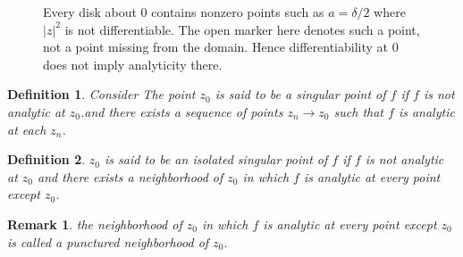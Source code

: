 \documentclass{report}
\newtheorem{definition}{Definition}
\newtheorem{remark}{Remark}
\begin{document}
\begin{figure}[H]
    \centering
    \caption{Every disk about $0$ contains nonzero points such as $a=\delta/2$ where $|z|^2$ is not differentiable. The open marker here denotes such a point, not a point missing from the domain. Hence differentiability at $0$ does not imply analyticity there.}
    \label{fig:modulus-not-analytic}
\end{figure}


\begin{definition}
    Consider The point $z_0$ is said to be a singular point of $f$ if $f$ is not analytic at $z_0$.and there exists a sequence of points $z_n \to z_0$ such that $f$ is analytic at each $z_n$.
\end{definition}

\begin{definition}
    $z_0$ is said to be an isolated singular point of $f$ if $f$ is not analytic at $z_0$ and 
    there exists a neighborhood of $z_0$ in which $f$ is analytic at every point except $z_0$.
\end{definition}


\begin{remark}
    the neighborhood of $z_0$ in which $f$ is analytic at every point except $z_0$ is called a punctured neighborhood of $z_0$.
\end{remark}
\end{document}
